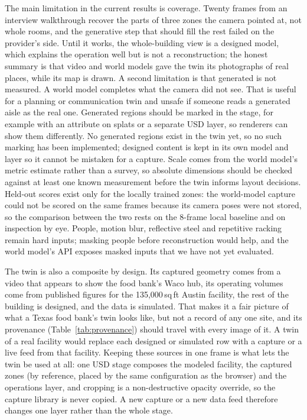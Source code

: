 \documentclass{article}
\begin{document}
The main limitation in the current results is coverage. Twenty frames from an
interview walkthrough recover the parts of three zones the camera pointed at,
not whole rooms, and the generative step that should fill the rest failed on
the provider's side. Until it works, the whole-building view is a designed
model, which explains the operation well but is not a reconstruction; the
honest summary is that video and world models gave the twin its photographs
of real places, while its map is drawn. A second limitation is that generated is not measured. A world model completes
what the camera did not see. That is useful for a planning or communication
twin and unsafe if someone reads a generated aisle as the real one. Generated
regions should be marked in the stage, for example with an attribute on splats
or a separate USD layer, so renderers can show them differently.
No generated regions exist in the twin yet, so no such marking has been
implemented; designed content is kept in its own model and layer so it cannot
be mistaken for a capture. Scale comes from the world model's metric
estimate rather than a survey, so absolute dimensions should be checked
against at least one known measurement before the twin informs layout
decisions. Held-out scores exist only for the locally trained zones: the
world-model capture could not be scored on the same frames because its
camera poses were not stored, so the comparison between the two rests on the
8-frame local baseline and on inspection by eye. People, motion blur, reflective steel and repetitive racking remain
hard inputs; masking people before reconstruction would help, and the world
model's API exposes masked inputs that we have not yet evaluated.

The twin is also a composite by design. Its captured geometry comes from a
video that appears to show the food bank's Waco hub, its operating volumes
come from published figures for the 135{,}000\,sq\,ft Austin facility, the
rest of the building is designed, and the data is simulated. That makes it a
fair picture of what a Texas food bank's twin looks like, but not a record of
any one site, and its provenance (Table~\ref{tab:provenance}) should travel
with every image of it. A twin of a real facility would replace each designed
or simulated row with a capture or a live feed from that facility. Keeping these sources in one frame is what lets the twin be
used at all: one USD stage composes the modeled facility, the captured zones
(by reference, placed by the same configuration as the browser) and the
operations layer, and cropping is a non-destructive opacity override, so the
capture library is never copied. A new capture or a new data feed therefore changes one layer rather
than the whole stage.
\end{document}
